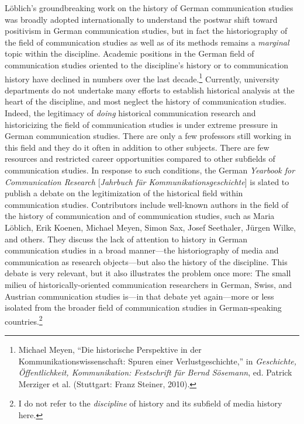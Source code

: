 \documentclass{tufte-handout}
\begin{document}
Löblich's groundbreaking work on the history of German communication
studies was broadly adopted internationally to understand the postwar
shift toward positivism in German communication studies, but in fact the
historiography of the field of communication studies as well as of its
methods remains a \emph{marginal} topic within the discipline. Academic
positions in the German field of communication studies oriented to the
discipline's history or to communication history have declined in
numbers over the last decade.\footnote{Michael Meyen, ``Die historische
  Perspektive in der Kommunikationswissenschaft: Spuren einer
  Verlustgeschichte,'' in \emph{Geschichte, Öffentlichkeit,
  Kommunikation: Festschrift für Bernd Sösemann}, ed. Patrick Merziger
  et al. (Stuttgart: Franz Steiner, 2010).} Currently, university
departments do not undertake many efforts to establish historical
analysis at the heart of the discipline, and most neglect the history of
communication studies. Indeed, the legitimacy of \emph{doing} historical
communication research and historicizing the field of communication
studies is under extreme pressure in German communication studies. There
are only a few professors still working in this field and they do it
often in addition to other subjects. There are few resources and
restricted career opportunities compared to other subfields of
communication studies. In response to such conditions, the German
\emph{Yearbook for Communication Research} {[}\emph{Jahrbuch für
Kommunikationsgeschichte}{]} is slated to publish a debate on the
legitimization of the historical field within communication studies.
Contributors include well-known authors in the field of the history of
communication and of communication studies, such as Maria Löblich, Erik
Koenen, Michael Meyen, Simon Sax, Josef Seethaler, Jürgen Wilke, and
others. They discuss the lack of attention to history in German
communication studies in a broad manner---the historiography of media
and communication as research objects---but also the history of the
discipline. This debate is very relevant, but it also illustrates the
problem once more: The small milieu of historically-oriented
communication researchers in German, Swiss, and Austrian communication
studies is---in that debate yet again---more or less isolated from the
broader field of communication studies in German-speaking
countries.\footnote{I do not refer to the \emph{discipline} of history
  and its subfield of media history here.}
\end{document}
